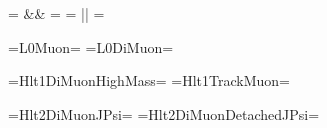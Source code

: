 
\newcommand{\HLTOne}{HLT1\xspace}
\newcommand{\HLTTwo}{HLT2\xspace}

= && =
\newcommand{\VerbAnd}{\UseVerb{tmp_And}\xspace}
= || =
\newcommand{\VerbOr}{\UseVerb{tmp_Or}\xspace}

=L0Muon=
\newcommand{\LZeroMuon}{\UseVerb{tmp_lzeromuon}\xspace}
=L0DiMuon=
\newcommand{\LZeroDiMuon}{\UseVerb{tmp_lzerodimuondec}\xspace}

=Hlt1DiMuonHighMass=
\newcommand{\HLTOneDiMuonHighMass}{\UseVerb{tmp_hltonedimuonhighmass}\xspace}
=Hlt1TrackMuon=
\newcommand{\HLTOneTrackMuon}{\UseVerb{tmp_hltonetrackmuon}\xspace}

=Hlt2DiMuonJPsi=
\newcommand{\HLTTwoDiMuonJpsi}{\UseVerb{tmp_hlttwodumuonjpsi}\xspace}
=Hlt2DiMuonDetachedJPsi=
\newcommand{\HLTTwoDiMuonDetachedJpsi}{\UseVerb{tmp_hlttwodimuondetachedjpsi}\xspace}
